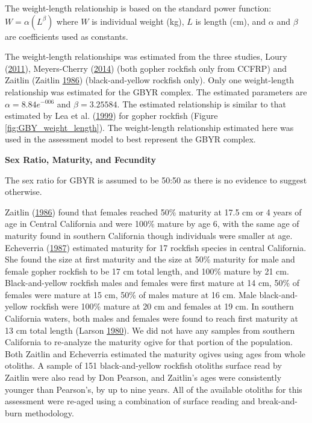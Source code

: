 \documentclass[12pt,]{article}
\begin{document}
The weight-length relationship is based on the standard power function:
\(W = \alpha(L^\beta)\) where \(W\) is individual weight (kg), \(L\) is
length (cm), and \(\alpha\) and \(\beta\) are coefficients used as
constants.

The weight-length relationships was estimated from the three studies,
Loury (\protect\hyperlink{ref-Loury2011}{2011}), Meyers-Cherry
(\protect\hyperlink{ref-MeyersCherry2014}{2014}) (both gopher rockfish
only from CCFRP) and Zaitlin (Zaitlin
\protect\hyperlink{ref-Zaitlin1986}{1986}) (black-and-yellow rockfish
only). Only one weight-length relationship was estimated for the GBYR
complex. The estimated parameters are \(\alpha = 8.84e^{-006}\) and
\(\beta = 3.25584\). The estimated relationship is similar to that
estimated by Lea et al. (\protect\hyperlink{ref-Lea1999}{1999}) for
gopher rockfish (Figure \ref{fig:GBY_weight_length}). The weight-length
relationship estimated here was used in the assessment model to best
represent the GBYR complex.

\vspace{.5cm} \textbf{Sex Ratio, Maturity, and Fecundity}

The sex ratio for GBYR is assumed to be 50:50 as there is no evidence to
suggest otherwise.

Zaitlin (\protect\hyperlink{ref-Zaitlin1986}{1986}) found that females
reached 50\% maturity at 17.5 cm or 4 years of age in Central California
and were 100\% mature by age 6, with the same age of maturity found in
southern California though individuals were smaller at age. Echeverria
(\protect\hyperlink{ref-Echeverria1987}{1987}) estimated maturity for 17
rockfish species in central California. She found the size at first
maturity and the size at 50\% maturity for male and female gopher
rockfish to be 17 cm total length, and 100\% mature by 21 cm.
Black-and-yellow rockfish males and females were first mature at 14 cm,
50\% of females were mature at 15 cm, 50\% of males mature at 16 cm.
Male black-and-yellow rockfish were 100\% mature at 20 cm and females at
19 cm. In southern California waters, both males and females were found
to reach first maturity at 13 cm total length (Larson
\protect\hyperlink{ref-Larson1980}{1980}). We did not have any samples
from southern California to re-analyze the maturity ogive for that
portion of the population. Both Zaitlin and Echeverria estimated the
maturity ogives using ages from whole otoliths. A sample of 151
black-and-yellow rockfish otoliths surface read by Zaitlin were also
read by Don Pearson, and Zaitlin's ages were consistently younger than
Pearson's, by up to nine years. All of the available otoliths for this
assessment were re-aged using a combination of surface reading and
break-and-burn methodology.
\end{document}
